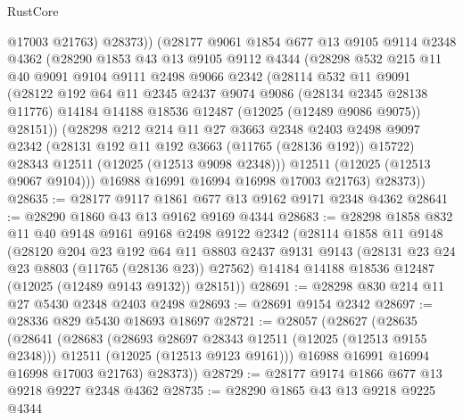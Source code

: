 \begin{lexlean}{RustCore}
\begin{coremodule}
            @17003
            @21763)
          @28373))
      (@28177
        @9061
        @1854
        @677
        @13
        @9105
        @9114
        @2348
        @4362
        (@28290
          @1853
          @43
          @13
          @9105
          @9112
          @4344
          (@28298
            @532
            @215
            @11
            @40
            @9091
            @9104
            @9111
            @2498
            @9066
            @2342
            (@28114
              @532
              @11
              @9091
              (@28122
                @192
                @64
                @11
                @2345
                @2437
                @9074
                @9086
                (@28134 @2345 @28138 @11776)
                @14184
                @14188
                @18536
                @12487
                (@12025 (@12489 @9086 @9075))
                @28151))
            (@28298
              @212
              @214
              @11
              @27
              @3663
              @2348
              @2403
              @2498
              @9097
              @2342
              (@28131 @192 @11 @192 @3663 (@11765 (@28136 @192)) @15722)
              @28343
              @12511
              (@12025 (@12513 @9098 @2348)))
            @12511
            (@12025 (@12513 @9067 @9104)))
          @16988
          @16991
          @16994
          @16998
          @17003
          @21763)
        @28373))
@28635 := @28177 @9117 @1861 @677 @13 @9162 @9171 @2348 @4362
@28641 := @28290 @1860 @43 @13 @9162 @9169 @4344
@28683 := @28298
    @1858
    @832
    @11
    @40
    @9148
    @9161
    @9168
    @2498
    @9122
    @2342
    (@28114
      @1858
      @11
      @9148
      (@28120
        @204
        @23
        @192
        @64
        @11
        @8803
        @2437
        @9131
        @9143
        (@28131 @23 @24 @23 @8803 (@11765 (@28136 @23)) @27562)
        @14184
        @14188
        @18536
        @12487
        (@12025 (@12489 @9143 @9132))
        @28151))
@28691 := @28298 @830 @214 @11 @27 @5430 @2348 @2403 @2498
@28693 := @28691 @9154 @2342
@28697 := @28336 @829 @5430 @18693 @18697
@28721 := @28057
    (@28627
      (@28635
        (@28641
          (@28683
            (@28693 @28697 @28343 @12511 (@12025 (@12513 @9155 @2348)))
            @12511
            (@12025 (@12513 @9123 @9161)))
          @16988
          @16991
          @16994
          @16998
          @17003
          @21763)
        @28373))
@28729 := @28177 @9174 @1866 @677 @13 @9218 @9227 @2348 @4362
@28735 := @28290 @1865 @43 @13 @9218 @9225 @4344

\end{coremodule}
\end{lexlean}
